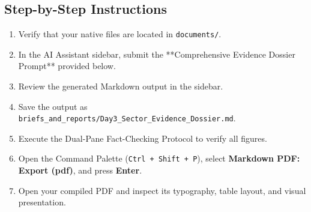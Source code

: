 \documentclass[11pt, a4paper]{report}
\begin{document}
\subsection{Step-by-Step Instructions}
\begin{enumerate}[label=\textbf{Step \arabic*:}]
    \item Verify that your native files are located in \texttt{documents/}.
    \item In the AI Assistant sidebar, submit the **Comprehensive Evidence Dossier Prompt** provided below.
    \item Review the generated Markdown output in the sidebar.
    \item Save the output as \texttt{briefs\_and\_reports/Day3\_Sector\_Evidence\_Dossier.md}.
    \item Execute the Dual-Pane Fact-Checking Protocol to verify all figures.
    \item Open the Command Palette (\texttt{Ctrl + Shift + P}), select \textbf{Markdown PDF: Export (pdf)}, and press \textbf{Enter}.
    \item Open your compiled PDF and inspect its typography, table layout, and visual presentation.
\end{enumerate}
\end{document}
